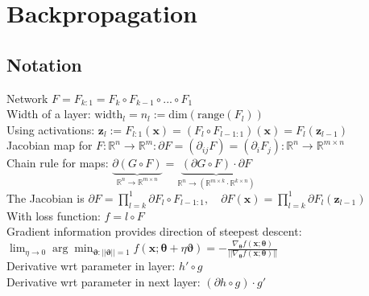 \section*{Backpropagation}
\subsection*{Notation}
Network $F = F_{k:1} = F_k \circ F_{k-1} \circ ... \circ F_1$ \\
Width of a layer: $\text{width}_l=n_l:=\text{dim}(\text{range}(F_l))$\\
Using activations: $\mathbf z_l:=F_{l:1}(\mathbf x)=(F_l\circ F_{l-1:1})(\mathbf x)=F_l(\mathbf z_{l-1})$\\
Jacobian map for $F:\mathbb R^n\rightarrow \mathbb R^m: \partial F=(\partial_{ij}F)=(\partial_i F_j): \mathbb R^n\rightarrow \mathbb R^{m\times n}$\\
Chain rule for maps: $\underbrace{\partial(G\circ F)}_{\mathbb R^n\rightarrow \mathbb R^{m\times n}}=\underbrace{(\partial G\circ F)\cdot\partial F}_{\mathbb R^n\rightarrow (\mathbb R^{m\times k}\cdot \mathbb R^{k\times n})}$\\
The Jacobian is 
$\partial F = \prod_{l = k}^1\partial F_l \circ F_{l-1:1}, \quad \partial F(\mathbf x)=\prod_{l = k}^1\partial F_l (\mathbf z_{l-1})$\\
With loss function: $f=l\circ F$\\
Gradient information provides direction of steepest descent:\\ $\lim_{\eta\rightarrow0}\arg\min_{\pmb \vartheta:||\pmb\vartheta||=1}f(\mathbf{x};\pmb\theta +\eta\pmb\vartheta)=-\frac{\nabla_{\pmb\theta}f(\mathbf x;\pmb\theta)}{||\nabla_{\pmb\theta}f(\mathbf x;\pmb\theta)||}$\\
Derivative wrt parameter in layer: $h'\circ g$\\
Derivative wrt parameter in next layer: $(\partial h\circ g)\cdot g'$

